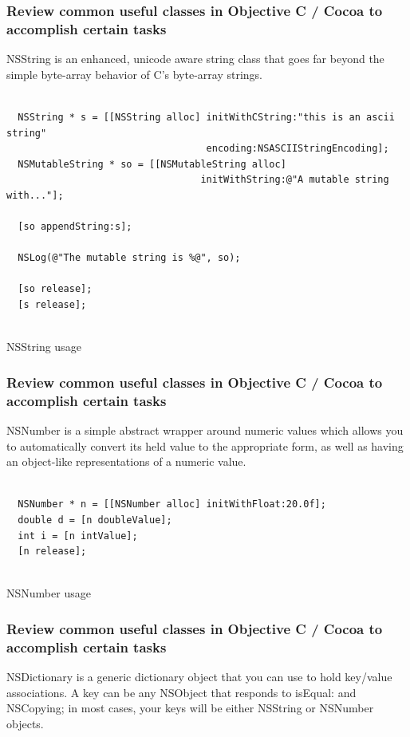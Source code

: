 \documentclass[10pt]{beamer}
\begin{document}
\begin{frame}[fragile]
  \frametitle{Review common useful classes in Objective C / Cocoa to accomplish certain tasks}
  NSString is an enhanced, unicode aware string class that goes far beyond the simple byte-array behavior of C's byte-array strings.
\begin{listing}[H]
    \begin{verbatim}
  
  NSString * s = [[NSString alloc] initWithCString:"this is an ascii string"
                                   encoding:NSASCIIStringEncoding];
  NSMutableString * so = [[NSMutableString alloc]
                                  initWithString:@"A mutable string with..."];
  
  [so appendString:s];
  
  NSLog(@"The mutable string is %@", so);
  
  [so release];
  [s release];
              
  \end{verbatim}
    \caption{NSString usage}
    \label{listing:20}
  \end{listing}

\end{frame}

\begin{frame}[fragile]
  \frametitle{Review common useful classes in Objective C / Cocoa to accomplish certain tasks}
  NSNumber is a simple abstract wrapper around numeric values which allows you to automatically convert its held value to the appropriate form, as well as having an object-like representations of a numeric value.
\begin{listing}[H]
    \begin{verbatim}
  
  NSNumber * n = [[NSNumber alloc] initWithFloat:20.0f];
  double d = [n doubleValue];
  int i = [n intValue];
  [n release];
              
  \end{verbatim}
    \caption{NSNumber usage}
    \label{listing:21}
  \end{listing}

\end{frame}

\begin{frame}[fragile]
  \frametitle{Review common useful classes in Objective C / Cocoa to accomplish certain tasks}
  NSDictionary is a generic dictionary object that you can use to hold key/value associations. A key can be any NSObject that responds to isEqual: and NSCopying; in most cases, your keys will be either NSString or NSNumber objects.

\end{frame}
\end{document}
